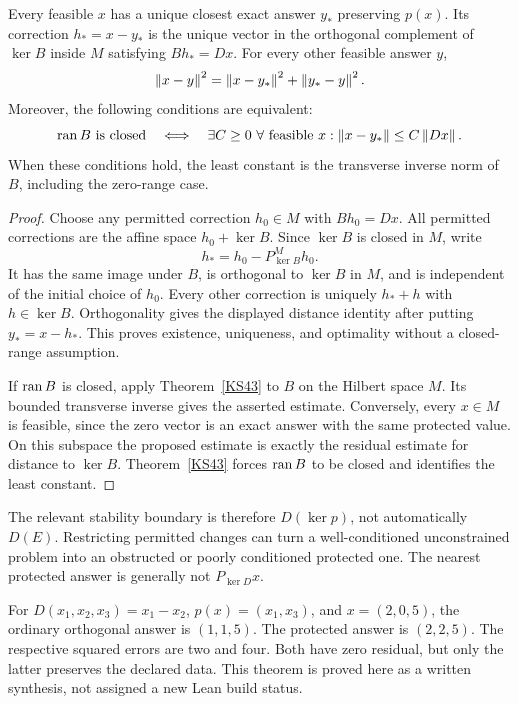 \begin{theorem}\label{KS56}
Every feasible \(x\) has a unique closest exact answer \(y_*\) preserving \(p(x)\). Its correction \(h_*=x-y_*\) is the unique vector in the orthogonal complement of \(\ker B\) inside \(M\) satisfying \(Bh_*=Dx\). For every other feasible answer \(y\),
\[
 \left\lVert x-y\right\rVert^2=\left\lVert x-y_*\right\rVert^2+\left\lVert y_*-y\right\rVert^2.
\]
Moreover, the following conditions are equivalent:
\[
 \operatorname{ran} B\text{ is closed}
 \quad\Longleftrightarrow\quad
 \exists C\ge0\ \forall\text{ feasible }x:
 \left\lVert x-y_*\right\rVert\le C\left\lVert Dx\right\rVert.
\]
When these conditions hold, the least constant is the transverse inverse norm of \(B\), including the zero-range case.
\end{theorem}
\begin{proof}
Choose any permitted correction \(h_0\in M\) with \(Bh_0=Dx\). All permitted corrections are the affine space \(h_0+\ker B\). Since \(\ker B\) is closed in \(M\), write
\[
 h_* = h_0-P_{\ker B}^{M}h_0.
\]
It has the same image under \(B\), is orthogonal to \(\ker B\) in \(M\), and is independent of the initial choice of \(h_0\). Every other correction is uniquely \(h_*+h\) with \(h\in\ker B\). Orthogonality gives the displayed distance identity after putting \(y_*=x-h_*\). This proves existence, uniqueness, and optimality without a closed-range assumption.

If \(\operatorname{ran} B\) is closed, apply Theorem~\ref{KS43} to \(B\) on the Hilbert space \(M\). Its bounded transverse inverse gives the asserted estimate. Conversely, every \(x\in M\) is feasible, since the zero vector is an exact answer with the same protected value. On this subspace the proposed estimate is exactly the residual estimate for distance to \(\ker B\). Theorem~\ref{KS43} forces \(\operatorname{ran} B\) to be closed and identifies the least constant.
\end{proof}
The relevant stability boundary is therefore \(D(\ker p)\), not automatically \(D(E)\). Restricting permitted changes can turn a well-conditioned unconstrained problem into an obstructed or poorly conditioned protected one. The nearest protected answer is generally not \(P_{\ker D}x\).

For \(D(x_1,x_2,x_3)=x_1-x_2\), \(p(x)=(x_1,x_3)\), and \(x=(2,0,5)\), the ordinary orthogonal answer is \((1,1,5)\). The protected answer is \((2,2,5)\). The respective squared errors are two and four. Both have zero residual, but only the latter preserves the declared data. This theorem is proved here as a written synthesis, not assigned a new Lean build status.

